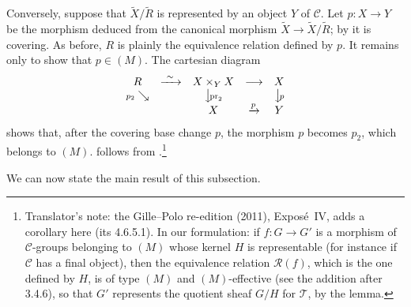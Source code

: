 Conversely, suppose that \(\widetilde X/\widetilde R\) is represented by
an object \(Y\) of \(\mathscr C\). Let \(p:X\to Y\) be the morphism
deduced from the canonical morphism
\(\widetilde X\to\widetilde X/\widetilde R\); by  it is covering.
As before, \(R\) is plainly the equivalence relation defined by \(p\).
It remains only to show that \(p\in(M)\). The cartesian diagram
\[
\begin{array}{ccccc}
 R&\xrightarrow{\ \sim\ }&X\times_YX&\longrightarrow&X\cr
 {\scriptstyle p_2}\searrow&&\big\downarrow\!{\scriptstyle\mathrm{pr}_2}
 &&\big\downarrow\!{\scriptstyle p}\cr
 &&X&\xrightarrow{p}&Y
\end{array}
\]
shows that, after the covering base change \(p\), the morphism \(p\)
becomes \(p_2\), which belongs to \((M)\).  follows from
.\footnote{Translator's note: the Gille--Polo re-edition (2011), Expos\'e~IV, adds a
corollary here (its 4.6.5.1). In our formulation: if \(f\colon G\to G'\) is a
morphism of \(\mathscr C\)-groups belonging to \((M)\) whose kernel \(H\) is
representable (for instance if \(\mathscr C\) has a final object), then the
equivalence relation \(\mathscr R(f)\), which is the one defined by \(H\), is
of type \((M)\) and \((M)\)-effective (see the addition after 3.4.6), so that
\(G'\) represents the quotient sheaf \(G/H\) for \(\mathcal T\), by the
lemma.}

We can now state the main result of this subsection.

